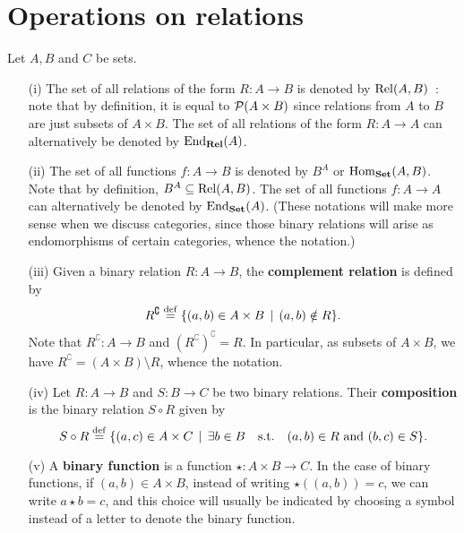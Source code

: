 \section{Operations on relations}

\begin{definition}
	Let $A,B$ and $C$ be sets.
	\begin{itemize}
		\item[(i)] The set of all relations of the form $R : A \to B$ is denoted by $\mathrm{Rel}(A,B)$~: note that by definition, it is equal to $\operatorname{\mathcal P}(A \times B)$ since relations from $A$ to $B$ are just subsets of $A \times B$. The set of all relations of the form $R : A \to A$ can alternatively be denoted by $\operatorname{\mathrm{End}}_{\mathbf{Rel}}(A)$. 
		\\

		\item[(ii)] The set of all functions $f: A \to B$ is denoted by $B^A$ or $\mathrm{Hom}_{\mathbf{Set}}(A,B)$. Note that by definition, $B^A \subseteq \mathrm{Rel}(A,B)$. The set of all functions $f : A \to A$ can alternatively be denoted by $\operatorname{\mathrm{End}}_{\mathbf{Set}}(A)$. (These notations will make more sense when we discuss categories, since those binary relations will arise as endomorphisms of certain categories, whence the notation.)
		\\

		\item[(iii)] Given a binary relation $R: A \to B$, the \textbf{complement relation} is defined by
		\[
			R^{\complement} \overset{\mathrm{def}}{=} \{ (a,b) \in A \times B \, \mid \, (a,b) \notin R \}.
		\]
		Note that $R^{\complement} : A \to B$ and $(R^{\complement})^{\complement} = R$. In particular, as subsets of $A \times B$, we have $R^{\complement} = (A \times B) \setminus R$, whence the notation.
		\\

		\item[(iv)] Let $R : A \to B$ and $S: B \to C$ be two binary relations. Their \textbf{composition} is the binary relation $S \circ R$ given by 
		\[
				S \circ R \overset{\mathrm{def}}{=} \{ (a,c) \in A \times C \, \mid \, \exists b \in B \quad \text{s.t.} \quad (a,b) \in R \text{ and } (b,c) \in S \}.
		\]

		\item[(v)] A \textbf{binary function} is a function $\star : A \times B \to C$. In the case of binary functions, if $(a,b) \in A \times B$, instead of writing $\star((a,b)) = c$, we can write $a \star b = c$, and this choice will usually be indicated by choosing a symbol instead of a letter to denote the binary function.
		\\
	\end{itemize}
\end{definition}

